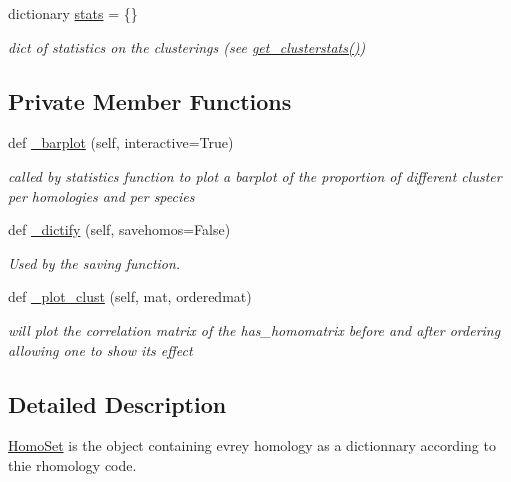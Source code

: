 \begin{DoxyCompactItemize}
\mbox{\label{class_py_c_u_b_1_1homoset_1_1_homo_set_a25c653d5b412d60a7c3663e327b222cf}} 
dictionary \mbox{\hyperlink{class_py_c_u_b_1_1homoset_1_1_homo_set_a25c653d5b412d60a7c3663e327b222cf}{stats}} = \{\}
\begin{DoxyCompactList}\small\item\em dict of statistics on the clusterings (see \mbox{\hyperlink{class_py_c_u_b_1_1homoset_1_1_homo_set_aa41e2430673cf29f96a522e03040ca1d}{get\+\_\+clusterstats()}}) \end{DoxyCompactList}\end{DoxyCompactItemize}
\subsection*{Private Member Functions}
\begin{DoxyCompactItemize}
\item 
def \mbox{\hyperlink{class_py_c_u_b_1_1homoset_1_1_homo_set_af6e8927ae33e2785ab21293a59628946}{\+\_\+barplot}} (self, interactive=True)
\begin{DoxyCompactList}\small\item\em called by statistics function to plot a barplot of the proportion of different cluster per homologies and per species \end{DoxyCompactList}\item 
def \mbox{\hyperlink{class_py_c_u_b_1_1homoset_1_1_homo_set_afd51ea6276ecae41960d426ce72755b0}{\+\_\+dictify}} (self, savehomos=False)
\begin{DoxyCompactList}\small\item\em Used by the saving function. \end{DoxyCompactList}\item 
def \mbox{\hyperlink{class_py_c_u_b_1_1homoset_1_1_homo_set_a795cfd3187026bde3c065aab9fe09642}{\+\_\+plot\+\_\+clust}} (self, mat, orderedmat)
\begin{DoxyCompactList}\small\item\em will plot the correlation matrix of the has\+\_\+homomatrix before and after ordering allowing one to show its effect \end{DoxyCompactList}\end{DoxyCompactItemize}


\subsection{Detailed Description}
\mbox{\hyperlink{class_py_c_u_b_1_1homoset_1_1_homo_set}{Homo\+Set}} is the object containing evrey homology as a dictionnary according to thie rhomology code. 

